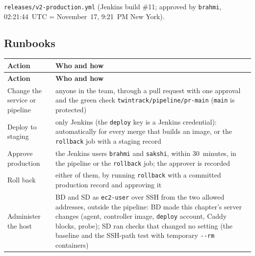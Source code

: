 \begin{longlisting}
\inputminted[fontsize=\scriptsize]{yaml}{config/twintrack/releases/v2-production.yml}
\caption{\texttt{releases/v2-production.yml} (Jenkins build \#11; approved by \texttt{brahmi}, 02:21:44~UTC = November~17, 9:21~PM New York).}
\label{Listing:EDeliveryRecV2P}
\end{longlisting}

\subsection{Runbooks}\label{Section:deliveryRunbooks}
\begin{tabularx}{\linewidth}{L{3.2cm}Y}
\caption{Who may do what\label{Table:DeliveryRights}}\\
\toprule \textbf{Action} & \textbf{Who and how}\\ \midrule
\endfirsthead
\toprule \textbf{Action} & \textbf{Who and how}\\ \midrule
\endhead \bottomrule \endlastfoot
Change the service or pipeline & anyone in the team, through a pull request with one approval and the green check \texttt{twintrack/pipeline/pr-main} (\texttt{main} is protected)\\
Deploy to staging & only Jenkins (the \texttt{deploy} key is a Jenkins credential): automatically for every merge that builds an image, or the \texttt{rollback} job with a staging record\\
Approve production & the Jenkins users \texttt{brahmi} and \texttt{sakshi}, within 30~minutes, in the pipeline or the \texttt{rollback} job; the approver is recorded\\
Roll back & either of them, by running \texttt{rollback} with a committed production record and approving it\\
Administer the host & BD and SD as \texttt{ec2-user} over SSH from the two allowed addresses, outside the pipeline: BD made this chapter's server changes (agent, controller image, \texttt{deploy} account, Caddy blocks, probe); SD ran checks that changed no setting (the baseline and the SSH-path test with temporary \texttt{-{}-rm} containers)\\
\end{tabularx}

